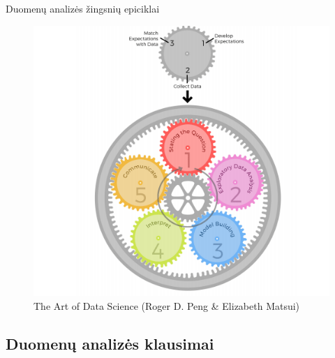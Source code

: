 \documentclass[11pt,xcolor=table]{beamer}
\begin{document}
\begin{frame}{Duomenų analizės žingsnių epiciklai}
\begin{figure}
\caption{The Art of Data Science (Roger D. Peng \& Elizabeth Matsui)}
\includegraphics[scale=0.49]{Epicycles-of-Analysis.png}
\end{figure}

\end{frame}


\subsection{Duomenų analizės klausimai}
\end{document}
